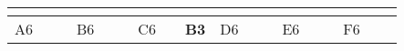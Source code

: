 \begin{landscape}
\begin{table}[h!]
\begin{tabular}{lcllcllcllcllcllcl}
                          & \multicolumn{1}{l}{}                                                                                                     &                              &                                                 & \multicolumn{1}{l}{}                                                                                                                                &                                                       &                         & \multicolumn{1}{l}{}                                                                                                     &                               &                                                 & \multicolumn{1}{l}{}                                                                                                                      &                                                       &                         & \multicolumn{1}{l}{}                                                                                                                &                               &                                                 & \multicolumn{1}{l}{}                                                                                                                                  &                                                       \\ \hline
\multicolumn{1}{|l|}{A6}  & \multicolumn{1}{c|}{}                                                                                                    & \multicolumn{1}{l|}{}        & \multicolumn{1}{l|}{\cellcolor[HTML]{C0C0C0}B6} & \multicolumn{1}{c|}{\cellcolor[HTML]{C0C0C0}}                                                                                                       & \multicolumn{1}{l|}{\cellcolor[HTML]{C0C0C0}{\bf A4}} & \multicolumn{1}{l|}{C6} & \multicolumn{1}{c|}{}                                                                                                    & \multicolumn{1}{l|}{{\bf B3}} & \multicolumn{1}{l|}{\cellcolor[HTML]{C0C0C0}D6} & \multicolumn{1}{c|}{\cellcolor[HTML]{C0C0C0}}                                                                                             & \multicolumn{1}{l|}{\cellcolor[HTML]{C0C0C0}{\bf C6}} & \multicolumn{1}{l|}{E6} & \multicolumn{1}{c|}{}                                                                                                               & \multicolumn{1}{l|}{}         & \multicolumn{1}{l|}{\cellcolor[HTML]{C0C0C0}F6} & \multicolumn{1}{c|}{\cellcolor[HTML]{C0C0C0}}                                                                                                         & \multicolumn{1}{l|}{\cellcolor[HTML]{C0C0C0}}         \\ \cline{1-1} \cline{3-4} \cline{6-7} \cline{9-10} \cline{12-13} \cline{15-16} \cline{18-18} 

\end{tabular}
\end{table}
\end{landscape}
